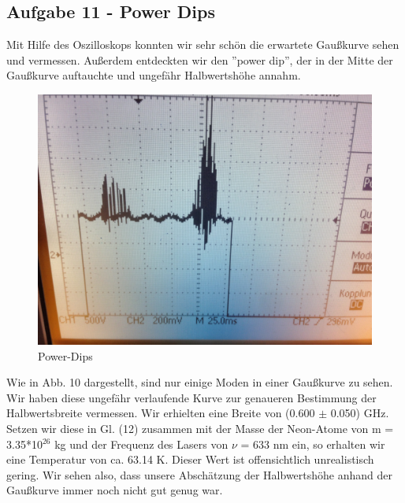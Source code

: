 \subsection{Aufgabe 11 - Power Dips}

Mit Hilfe des Oszilloskops konnten wir sehr schön die erwartete Gaußkurve sehen und vermessen. Außerdem entdeckten wir den ''power dip'', der in der Mitte der Gaußkurve auftauchte und ungefähr Halbwertshöhe annahm. 

\begin{figure}[here]
\centering
\includegraphics[scale=0.1]{img/62}
\caption{Power-Dips}
\begin{center}
\end{center}
\end{figure}

Wie in Abb. 10 dargestellt, sind nur einige Moden in einer Gaußkurve zu sehen. Wir haben diese ungefähr verlaufende Kurve zur genaueren Bestimmung der Halbwertsbreite vermessen. Wir erhielten eine Breite von (0.600 $\pm$ 0.050) GHz. Setzen wir diese in Gl. (12) zusammen mit der Masse der Neon-Atome von m = 3.35*10$^{26}$ kg und der Frequenz des Lasers von $\nu$ = 633 nm ein, so erhalten wir eine Temperatur von ca. 63.14 K. Dieser Wert ist offensichtlich unrealistisch gering. Wir sehen also, dass unsere Abschätzung der Halbwertshöhe anhand der Gaußkurve immer noch nicht gut genug war.
